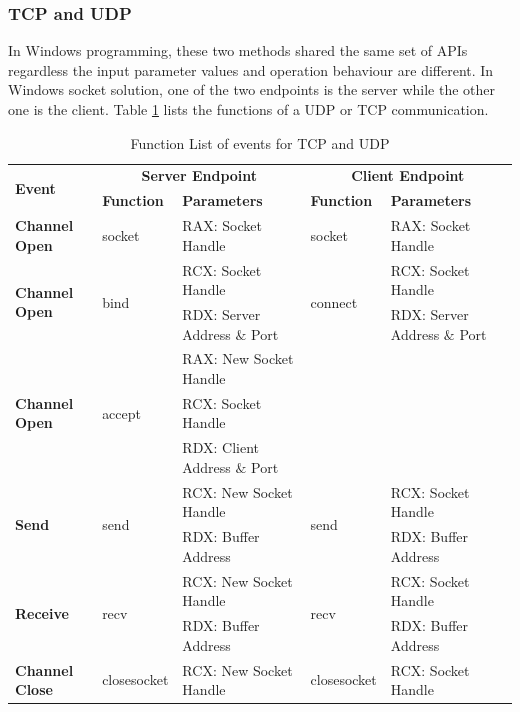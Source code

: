 \subsubsection{TCP and UDP}
In Windows programming, these two methods shared the same set of APIs regardless the input parameter values and operation behaviour are different. In Windows socket solution, one of the two endpoints is the server while the other one is the client. Table \ref{tcpupdfunctions} lists the functions of a UDP or TCP communication. 
  \begin{table}[H]
        \centering
        \caption{Function List  of events for TCP and UDP}
        \label{tcpupdfunctions}
        \begin{tabular}{|l|l|l|l|l|}
            \hline
             \multirow{2}{*}{\textbf{Event}} &
               \multicolumn{2}{c|}{\textbf{Server Endpoint}} &
               \multicolumn{2}{c|}{\textbf{Client Endpoint}} \\
             \cline{2-5}
              & \textbf{Function}& \textbf{Parameters} & \textbf{Function} & \textbf{Parameters}  \\
             \hline
             \textbf{Channel Open}
             &socket&  RAX: Socket Handle & socket &  RAX: Socket Handle\\
             \hline
                \multirow{2}{*}{{\textbf{Channel Open}}}
              &\multirow{2}{*}{{bind}} &  RCX: Socket Handle & \multirow{2}{*}{connect} &  RCX: Socket Handle\\
              \cline{3-3} \cline{5-5}
             &&  RDX: Server Address $\&$ Port &  &  RDX: Server Address $\&$ Port\\
            \hline
                \multirow{3}{*}{{\textbf{Channel Open}}}
             &\multirow{3}{*}{{accept}} &  RAX: New Socket Handle && \\
              \cline{3-3} 
             &&  RCX:  Socket Handle &  & \\
             \cline{3-3} 
             &&  RDX: Client Address $\&$ Port &  &  \\
            \hline
             \multirow{2}{*}{{\textbf{Send}}}
             &\multirow{2}{*}{send} &  RCX: New Socket Handle & \multirow{2}{*}{send} &  RCX: Socket Handle\\
              \cline{3-3} \cline{5-5}
             &&  RDX: Buffer Address &  &  RDX: Buffer Address\\
           \hline
              \multirow{2}{*}{{\textbf{Receive}}}
             & \multirow{2}{*}{recv}&  RCX: New Socket Handle & \multirow{2}{*}{recv} &  RCX: Socket Handle\\
              \cline{3-3} \cline{5-5}
              &&  RDX: Buffer Address &  &  RDX: Buffer Address\\
            \hline
          {{\textbf{Channel Close}}}&
            {closesocket} & {RCX: New Socket Handle} &{closesocket} & {RCX: Socket Handle}\\
            \hline
        \end{tabular}
    \end{table} 
   

